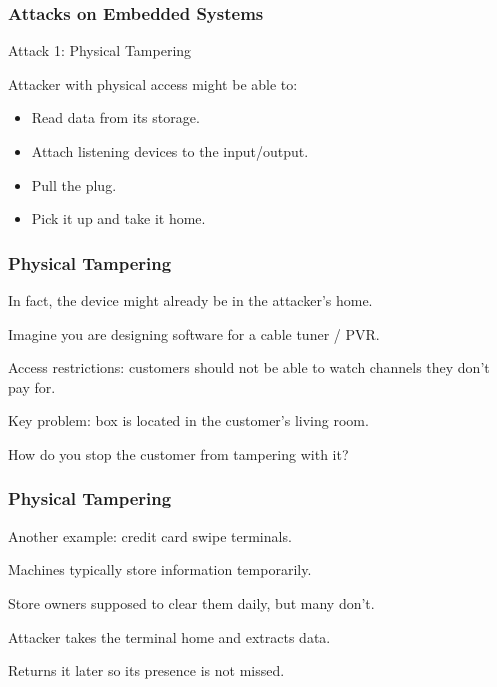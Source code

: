 \begin{frame}
\frametitle{Attacks on Embedded Systems}
\begin{changemargin}{1cm}

Attack 1: Physical Tampering

Attacker with physical access might be able to:

\begin{itemize}
	\item Read data from its storage.
	\item Attach listening devices to the input/output.
	\item Pull the plug.
	\item Pick it up and take it home.
\end{itemize}

\end{changemargin}
\end{frame}

\begin{frame}
\frametitle{Physical Tampering}
\begin{changemargin}{1cm}

In fact, the device might already be in the attacker's home.

Imagine you are designing software for a cable tuner / PVR.

Access restrictions: customers should not be able to watch channels they don't pay for.

Key problem: box is located in the customer's living room.

How do you stop the customer from tampering with it?

\end{changemargin}
\end{frame}

\begin{frame}
\frametitle{Physical Tampering}
\begin{changemargin}{1cm}

Another example: credit card swipe terminals.

Machines typically store information temporarily.

Store owners supposed to clear them daily, but many don't.

Attacker takes the terminal home and extracts data.

Returns it later so its presence is not missed.

\end{changemargin}
\end{frame}


